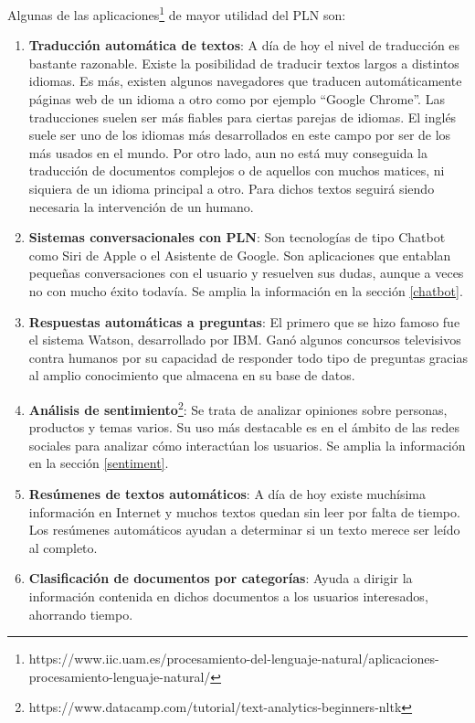 Algunas de las aplicaciones\footnote{https://www.iic.uam.es/procesamiento-del-lenguaje-natural/aplicaciones-procesamiento-lenguaje-natural/} de mayor utilidad del PLN son:

\begin{enumerate}
	\item \textbf{Traducción automática de textos}: A día de hoy el nivel de traducción es bastante razonable. Existe la posibilidad de traducir textos largos a distintos idiomas. Es más, existen algunos navegadores que traducen automáticamente páginas web de un idioma a otro como por ejemplo ``Google Chrome''. Las traducciones suelen ser más fiables para ciertas parejas de idiomas. El inglés suele ser uno de los idiomas más desarrollados en este campo por ser de los más usados en el mundo. Por otro lado, aun no está muy conseguida la traducción de documentos complejos o de aquellos con muchos matices, ni siquiera de un idioma principal a otro. Para dichos textos seguirá siendo necesaria la intervención de un humano.
	\item \textbf{Sistemas conversacionales con PLN}: Son tecnologías de tipo Chatbot como Siri de Apple o el Asistente de Google. Son aplicaciones que entablan pequeñas conversaciones con el usuario y resuelven sus dudas, aunque a veces no con mucho éxito todavía. Se amplia la información en la sección \ref{chatbot}.
	\item \textbf{Respuestas automáticas a preguntas}: El primero que se hizo famoso fue el sistema Watson, desarrollado por IBM. Ganó algunos concursos televisivos contra humanos por su capacidad de responder todo tipo de preguntas gracias al amplio conocimiento que almacena en su base de datos.
	\item \textbf{Análisis de sentimiento}\footnote{https://www.datacamp.com/tutorial/text-analytics-beginners-nltk}: Se trata de analizar opiniones sobre personas, productos y temas varios. Su uso más destacable es en el ámbito de las redes sociales para analizar cómo interactúan los usuarios. Se amplia la información en la sección \ref{sentiment}.
	\item \textbf{Resúmenes de textos automáticos}: A día de hoy existe muchísima  información en Internet y muchos textos quedan sin leer por falta de tiempo. Los resúmenes automáticos ayudan a determinar si un texto merece ser leído al completo. 
	\item \textbf{Clasificación de documentos por categorías}: Ayuda a dirigir la información contenida en dichos documentos a los usuarios interesados, ahorrando tiempo. 
\end{enumerate}


